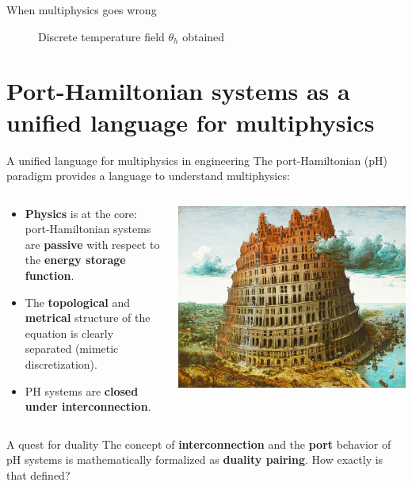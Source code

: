 \documentclass[aspectratio=169]{beamer}
\begin{document}
\begin{frame}{When multiphysics goes wrong}
\begin{figure}[t]
\begin{subfigure}[t]{0.32\textwidth}
	\end{subfigure}
\caption{Discrete temperature field $\theta_h$ obtained }
\end{figure}

\end{frame}

\section{Port-Hamiltonian systems as a unified language for multiphysics}

\begin{frame}{A unified language for multiphysics in engineering}
	The port-Hamiltonian (pH) paradigm provides a language to understand multiphysics:
	\vspace{.3cm}
	\begin{columns}
		\begin{column}{.65\textwidth}
			\begin{itemize}
				\item \textbf{Physics} is at the core: port-Hamiltonian systems are \textbf{passive} with respect to the \textbf{energy storage function}.
				\item The \textbf{topological} and \textbf{metrical} structure of the equation is clearly separated (mimetic discretization).
				\item PH systems are \textbf{closed under interconnection}. 
			\end{itemize}
		\end{column}
		\begin{column}{.35\textwidth}
			\centering
			\includegraphics[width=.9\columnwidth]{babel_tower.jpeg}
		\end{column}
	\end{columns}
\begin{block}{A quest for duality}
	The concept of \textbf{interconnection} and the \textbf{port} behavior of pH systems is mathematically formalized as \textbf{duality pairing}. How exactly is that defined?
\end{block}


\end{frame}
\end{document}
